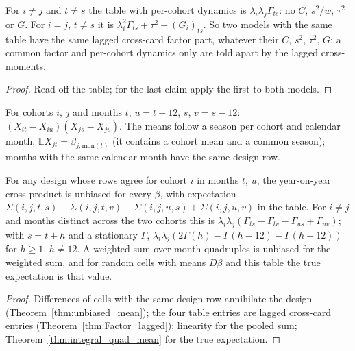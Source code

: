 \begin{theorem}\label{thm:Factor_lagged}
  \leanok
  For $i \ne j$ and $t \ne s$ the table with per-cohort dynamics is
  $\lambda_i\lambda_j\Gamma_{ts}$: no $C$, $s^2/w$, $\tau^2$ or $G$. For $i = j$, $t \ne s$ it is
  $\lambda_i^2\Gamma_{ts} + \tau^2 + (G_i)_{ts}$. So two models with the same table have the
  same lagged cross-card factor part, whatever their $C$, $s^2$, $\tau^2$, $G$: a common
  factor and per-cohort dynamics only are told apart by the lagged cross-moments.
\end{theorem}
\begin{proof}
  \leanok
  Read off the table; for the last claim apply the first to both models.
\end{proof}

\begin{definition}\label{def:Factor_yoy}
  \leanok
  For cohorts $i$, $j$ and months $t$, $u = t - 12$, $s$, $v = s - 12$:
  $(X_{it} - X_{iu})(X_{js} - X_{jv})$. The means follow a season per cohort and calendar month,
  $\mathbb E X_{jt} = \beta_{j,\mathrm{mon}(t)}$ (it contains a cohort mean and a common
  season); months with the same calendar month have the same design row.
\end{definition}

\begin{theorem}\label{thm:Factor_yoy}
  \leanok
  For any design whose rows agree for cohort $i$ in months $t$, $u$, the year-on-year
  cross-product is unbiased for every $\beta$, with expectation
  $\Sigma(i,j,t,s) - \Sigma(i,j,t,v) - \Sigma(i,j,u,s) + \Sigma(i,j,u,v)$ in the table.
  For $i \ne j$ and months distinct across the two cohorts this is
  $\lambda_i\lambda_j(\Gamma_{ts} - \Gamma_{tv} - \Gamma_{us} + \Gamma_{uv})$; with
  $s = t + h$ and a stationary $\Gamma$, $\lambda_i\lambda_j(2\Gamma(h) - \Gamma(h-12) -
  \Gamma(h+12))$ for $h \ge 1$, $h \ne 12$. A weighted sum over month quadruples is unbiased
  for the weighted sum, and for random cells with means $D\beta$ and this table the true
  expectation is that value.
\end{theorem}
\begin{proof}
  \leanok
  Differences of cells with the same design row annihilate the design
  (Theorem~\ref{thm:unbiased_mean}); the four table entries are lagged cross-card entries
  (Theorem~\ref{thm:Factor_lagged}); linearity for the pooled sum;
  Theorem~\ref{thm:integral_quad_mean} for the true expectation.
\end{proof}

